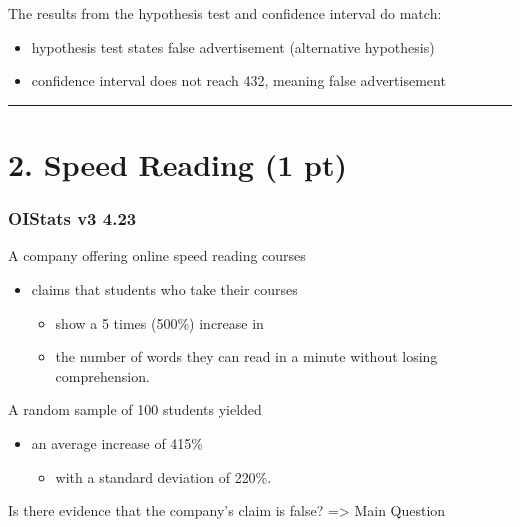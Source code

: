 \documentclass[
]{article}
\providecommand{\tightlist}{%
  \setlength{\itemsep}{0pt}\setlength{\parskip}{0pt}}
\begin{document}
The results from the hypothesis test and confidence interval do match:

\begin{itemize}
\item
  hypothesis test states false advertisement (alternative hypothesis)
\item
  confidence interval does not reach 432, meaning false advertisement
\end{itemize}

\begin{center}\rule{0.5\linewidth}{0.5pt}\end{center}

\hypertarget{speed-reading-1-pt}{%
\section{2. Speed Reading (1 pt)}\label{speed-reading-1-pt}}

\hypertarget{oistats-v3-4.23}{%
\subsubsection{OIStats v3 4.23}\label{oistats-v3-4.23}}

A company offering online speed reading courses

\begin{itemize}
\tightlist
\item
  claims that students who take their courses

  \begin{itemize}
  \tightlist
  \item
    show a 5 times (500\%) increase in
  \item
    the number of words they can read in a minute without losing
    comprehension.
  \end{itemize}
\end{itemize}

A random sample of 100 students yielded

\begin{itemize}
\tightlist
\item
  an average increase of 415\%

  \begin{itemize}
  \tightlist
  \item
    with a standard deviation of 220\%.
  \end{itemize}
\end{itemize}

Is there evidence that the company's claim is false? =\textgreater{}
Main Question
\end{document}

